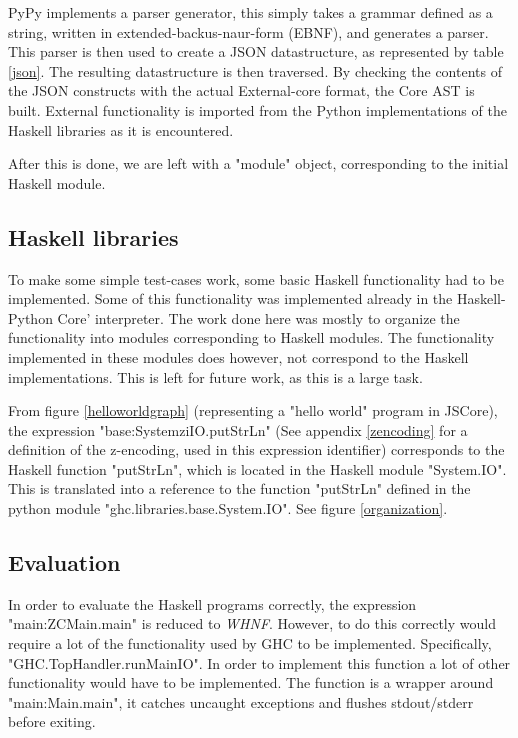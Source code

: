 PyPy implements a parser generator, this simply takes a grammar defined as a string, written in
extended-backus-naur-form (EBNF), and generates a parser. This parser is then used to create a 
JSON datastructure, as represented by table \ref{json}.
The resulting datastructure is then traversed. By checking the contents of the JSON constructs
with the actual External-core format, the Core AST is built. External functionality is imported
from the Python implementations of the Haskell libraries as it is encountered. 

After this is done, we are left with a "module" object, corresponding to the initial Haskell
module. 

\subsection{Haskell libraries}

To make some simple test-cases work, some basic Haskell functionality had to be 
implemented. Some of this functionality was implemented already in the 
Haskell-Python Core' interpreter.
The work done here was mostly to organize the functionality into modules corresponding
to Haskell modules. The functionality implemented in these modules does however, 
not correspond to the Haskell implementations. This is left for future work, as this 
is a large task.

From figure \ref{helloworldgraph} (representing a "hello world" program in JSCore), 
the expression "base:SystemziIO.putStrLn" (See appendix \ref{zencoding} for a definition of
the z-encoding, used in this expression identifier) corresponds
to the Haskell function "putStrLn", which is located in the Haskell module "System.IO". 
This is translated into a reference to the function "putStrLn" defined in the python module 
"ghc.libraries.base.System.IO". See figure \ref{organization}.

\subsection{Evaluation}
\begin{sloppypar}
In order to evaluate the Haskell programs correctly, the expression "main:ZCMain.main" 
is reduced to \emph{WHNF}. However, to do this correctly would require a lot of 
the functionality used by GHC
to be implemented. Specifically, "GHC.TopHandler.runMainIO". 
In order to implement this function
a lot of other functionality would have to be implemented. 
The function is a wrapper around 
"main:Main.main", it catches uncaught exceptions and flushes stdout/stderr 
before exiting. 
\end{sloppypar}

